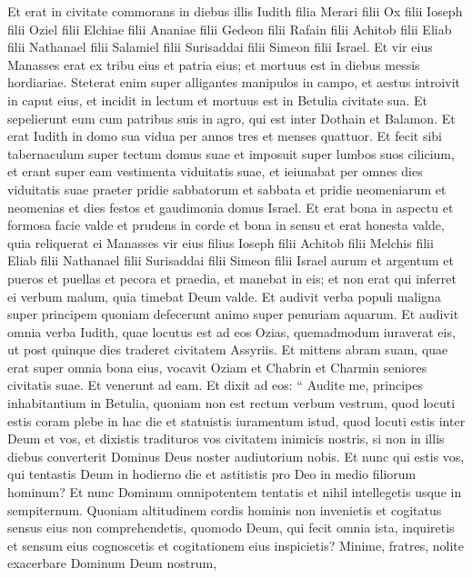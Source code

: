 \begin{biblechapter}
\begin{biblechapter}
\begin{biblechapter}
\begin{biblechapter}
\begin{biblechapter}
\begin{biblechapter}
\begin{biblechapter}
\begin{biblechapter}
\verse Et erat in civitate commorans in diebus illis Iudith filia Merari filii Ox filii Ioseph filii Oziel filii Elchiae filii Ananiae filii Gedeon filii Rafain filii Achitob filii Eliab filii Nathanael filii Salamiel filii Surisaddai filii Simeon filii Israel. 
\verse Et vir eius Manasses erat ex tribu eius et patria eius; et mortuus est in diebus messis hordiariae. 
\verse Steterat enim super alligantes manipulos in campo, et aestus introivit in caput eius, et incidit in lectum et mortuus est in Betulia civitate sua. Et sepelierunt eum cum patribus suis in agro, qui est inter Dothain et Balamon. 
\verse Et erat Iudith in domo sua vidua per annos tres et menses quattuor. 
\verse Et fecit sibi tabernaculum super tectum domus suae et imposuit super lumbos suos cilicium, et erant super eam vestimenta viduitatis suae, 
\verse et ieiunabat per omnes dies viduitatis suae praeter pridie sabbatorum et sabbata et pridie neomeniarum et neomenias et dies festos et gaudimonia domus Israel. 
\verse Et erat bona in aspectu et formosa facie valde et prudens in corde et bona in sensu et erat honesta valde, quia reliquerat ei Manasses vir eius filius Ioseph filii Achitob filii Melchis filii Eliab filii Nathanael filii Surisaddai filii Simeon filii Israel aurum et argentum et pueros et puellas et pecora et praedia, et manebat in eis; 
\verse et non erat qui inferret ei verbum malum, quia timebat Deum valde.
 \verse Et audivit verba populi maligna super principem quoniam defecerunt animo super penuriam aquarum. Et audivit omnia verba Iudith, quae locutus est ad eos Ozias, quemadmodum iuraverat eis, ut post quinque dies traderet civitatem Assyriis. 
 \verse Et mittens abram suam, quae erat super omnia bona eius, vocavit Oziam et Chabrin et Charmin seniores civitatis suae.
 \verse Et venerunt ad eam. Et dixit ad eos: “ Audite me, principes inhabitantium in Betulia, quoniam non est rectum verbum vestrum, quod locuti estis coram plebe in hac die et statuistis iuramentum istud, quod locuti estis inter Deum et vos, et dixistis tradituros vos civitatem inimicis nostris, si non in illis diebus converterit Dominus Deus noster audiutorium nobis. 
\verse Et nunc qui estis vos, qui tentastis Deum in hodierno die et astitistis pro Deo in medio filiorum hominum? 
\verse Et nunc Dominum omnipotentem tentatis et nihil intellegetis usque in sempiternum. 
\verse Quoniam altitudinem cordis hominis non invenietis et cogitatus sensus eius non comprehendetis, quomodo Deum, qui fecit omnia ista, inquiretis et sensum eius cognoscetis et cogitationem eius inspicietis? Minime, fratres, nolite exacerbare Dominum Deum nostrum, 

\end{biblechapter}
\end{biblechapter}
\end{biblechapter}
\end{biblechapter}
\end{biblechapter}
\end{biblechapter}
\end{biblechapter}
\end{biblechapter}
